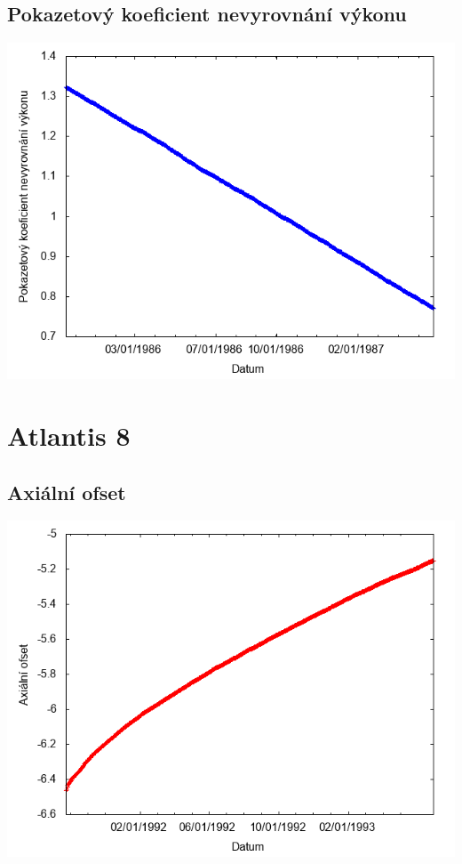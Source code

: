 \documentclass[a4paper,twoside,11pt]{article}
\begin{document}
\subsection*{Pokazetový koeficient nevyrovnání výkonu}
\begin{center}
\includegraphics[width=.8\textwidth]{graphs/Atlantis_07_fha.png}
\end{center}

\newpage
\section*{Atlantis 8}
\subsection*{Axiální ofset}
\begin{center}
\includegraphics[width=.8\textwidth]{graphs/Atlantis_08_ao.png}
\end{center}
\end{document}
